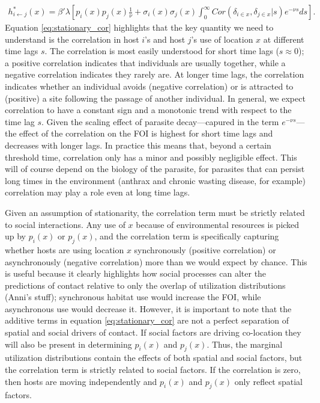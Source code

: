 \documentclass[letterpaper]{article}
\begin{document}
\begin{equation}
    \begin{aligned}
    h^*_{i \leftarrow j}(x) = \beta' \lambda \left[ p_i(x)p_j(x) \frac{1}{\nu} + \sigma_i(x) \sigma_j(x) \int_{0}^{\infty} Cor(\delta_{i \in x}, \delta_{j \in x} | s) e^{-\nu s} ds\right].
    \end{aligned}
    \label{eq:stationary_cor}
\end{equation}
Equation \ref{eq:stationary_cor} highlights that the key quantity we need to understand is the correlation in host $i$'s and host $j$'s use of location $x$ at different time lags $s$. The correlation is most easily understood for short time lags ($s\approx0$); a positive correlation indicates that individuals are usually together, while a negative correlation indicates they rarely are. At longer time lags, the correlation indicates whether an individual avoids (negative correlation) or is attracted to (positive) a site following the passage of another individual. In general, we expect correlation to have a constant sign and a monotonic trend with respect to the time lag $s$. %
Given the scaling effect of parasite decay---capured in the term $e^{-\nu s}$---the effect of the correlation on the FOI is highest for short time lags and decreases with longer lags. In practice this means that, beyond a certain threshold time, correlation  only has a minor and possibly negligible effect. This will of course depend on the biology of the parasite, for parasites that can persist long times in the environment (anthrax and chronic wasting disease, for example) correlation may play a role even at long time lags.

Given an assumption of stationarity, the correlation term must be strictly related to social interactions.  Any use of $x$ because of environmental resources is picked up by $p_i(x)$ or $p_j(x)$, and the correlation term is specifically capturing whether hosts are using location $x$ synchronously (positive correlation) or asynchronously (negative correlation) more than we would expect by chance.  This is useful because it clearly highlights how social processes can alter the predictions of contact relative to only the overlap of utilization distributions (Anni's stuff); synchronous habitat use would increase the FOI, while asynchronous use would decrease it. However, it is important to note that the additive terms in equation \ref{eq:stationary_cor} are not a perfect separation of spatial and social drivers of contact. If social factors are driving co-location they will also be present in determining $p_i(x)$ and $p_j(x)$. Thus, the marginal utilization distributions contain the effects of both spatial and social factors, but the correlation term is strictly related to social factors.  If the correlation is zero, then hosts are moving independently and $p_i(x)$ and $p_j(x)$ only reflect spatial factors.
\end{document}
